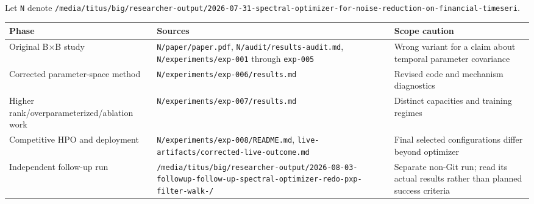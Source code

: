 \documentclass[
  british,
  10pt,
  a4paper,
]{article}
\newcounter{none} %
\begin{document}
Let \texttt{N} denote
\texttt{/\allowbreak{}media/\allowbreak{}titus/\allowbreak{}big/\allowbreak{}researcher-\allowbreak{}output/\allowbreak{}2026-\allowbreak{}07-\allowbreak{}31-\allowbreak{}spectral-\allowbreak{}optimizer-\allowbreak{}for-\allowbreak{}noise-\allowbreak{}reduction-\allowbreak{}on-\allowbreak{}financial-\allowbreak{}timeseri}.

{\def\LTcaptype{none} %
\begin{longtable}[]{@{}
  >{\raggedright\arraybackslash}p{}
  >{\raggedright\arraybackslash}p{}
  >{\raggedright\arraybackslash}p{}@{}}
\toprule\noalign{}
\begin{minipage}[b]{\linewidth}\raggedright
Phase
\end{minipage} & \begin{minipage}[b]{\linewidth}\raggedright
Sources
\end{minipage} & \begin{minipage}[b]{\linewidth}\raggedright
Scope caution
\end{minipage} \\
\midrule\noalign{}
\endhead
\bottomrule\noalign{}
\endlastfoot
Original B×B study &
\texttt{N/\allowbreak{}paper/\allowbreak{}paper.\allowbreak{}pdf},
\texttt{N/\allowbreak{}audit/\allowbreak{}results-\allowbreak{}audit.\allowbreak{}md},
\texttt{N/\allowbreak{}experiments/\allowbreak{}exp-\allowbreak{}001}
through \texttt{exp-005} & Wrong variant for a claim about temporal
parameter covariance \\
Corrected parameter-\allowbreak{}space method &
\texttt{N/\allowbreak{}experiments/\allowbreak{}exp-\allowbreak{}006/\allowbreak{}results.\allowbreak{}md}
& Revised code and mechanism diagnostics \\
Higher
rank/\allowbreak{}overparamete\allowbreak{}rized/\allowbreak{}ablation
work &
\texttt{N/\allowbreak{}experiments/\allowbreak{}exp-\allowbreak{}007/\allowbreak{}results.\allowbreak{}md}
& Distinct capacities and training regimes \\
Competitive HPO and deployment &
\texttt{N/\allowbreak{}experiments/\allowbreak{}exp-\allowbreak{}008/\allowbreak{}README.\allowbreak{}md},
\texttt{live-\allowbreak{}artifacts/\allowbreak{}corrected-\allowbreak{}live-\allowbreak{}outcome.\allowbreak{}md}
& Final selected configurations differ beyond optimizer \\
Independent follow-up run &
\texttt{/\allowbreak{}media/\allowbreak{}titus/\allowbreak{}big/\allowbreak{}researcher-\allowbreak{}output/\allowbreak{}2026-\allowbreak{}08-\allowbreak{}03-\allowbreak{}followup-\allowbreak{}follow-\allowbreak{}up-\allowbreak{}spectral-\allowbreak{}optimizer-\allowbreak{}redo-\allowbreak{}pxp-\allowbreak{}filter-\allowbreak{}walk-\allowbreak{}/\allowbreak{}}
& Separate non-Git run; read its actual results rather than planned
success criteria \\
\end{longtable}
}
\end{document}
